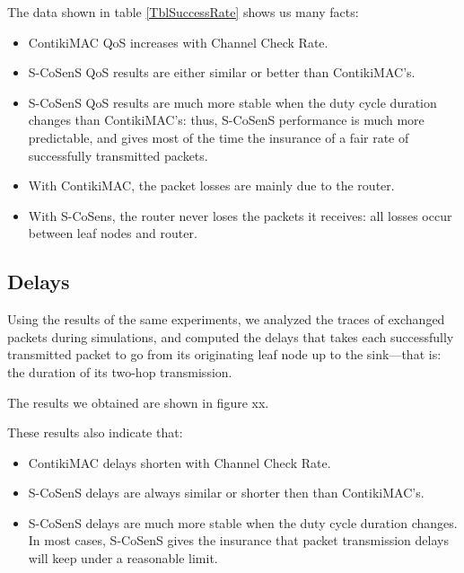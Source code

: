 \documentclass[a4paper,twoside]{article}
\begin{document}
The data shown in table \ref{TblSuccessRate} shows us many facts:

\begin{itemize}

\item ContikiMAC QoS increases with Channel Check Rate.

\item S-CoSenS QoS results are either similar or better than ContikiMAC's.

\item S-CoSenS QoS results are much more stable when the duty cycle duration
      changes than ContikiMAC's: thus, S-CoSenS performance is much more
      predictable, and gives most of the time the insurance of a fair
      rate of successfully transmitted packets.

\item With ContikiMAC, the packet losses are mainly due to the router.

\item With S-CoSens, the router never loses the packets it receives:
      all losses occur between leaf nodes and router.

\end{itemize}


\subsection{Delays}

Using the results of the same experiments, we analyzed the traces of
exchanged packets during simulations, and computed the delays that takes each
successfully transmitted packet to go from its originating leaf node up to
the sink---that is: the duration of its two-hop transmission.

The results we obtained are shown in figure xx.

These results also indicate that:

\begin{itemize}

\item ContikiMAC delays shorten with Channel Check Rate.

\item S-CoSenS delays are always similar or shorter then than ContikiMAC's.

\item S-CoSenS delays are much more stable when the duty cycle duration
      changes. In most cases, S-CoSenS gives the insurance that packet
      transmission delays will keep under a reasonable limit.

\end{itemize}
\end{document}
